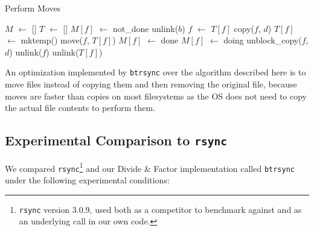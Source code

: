 \documentclass[11pt]{llncs}
\newcommand*\Let[2]{\State #1 $\gets$ #2}
\newcommand{\btrsync}{\texttt{btrsync}\xspace}
\newcommand{\rsync}{\texttt{rsync}\xspace}
\begin{document}
\begin{algorithm}
  \caption{Perform Moves}
  \label{alg:moves}
  \begin{algorithmic}[1]
    \Statex
    \Let{$M$}{[]}
    \Let{$T$}{[]}
      \Let{$M[f]$}{not\_done}
    \EndFor
          \State unlink($b$) 
        \Else
          \State {} 
        \EndIf
      \EndIf
        \Let{$f$}{$T[f]$}
      \EndIf
      \State copy($f$, $d$)
    \EndFunction
        \State \Return {}
      \EndIf
        \Let{$T[f]$}{mktemp()}
        \State move($f$, $T[f]$)
        \Let{$M[f]$}{done}
        \State \Return {}
      \EndIf
      \Let{$M[f]$}{doing}
          \State unblock\_copy($f$, $d$) 
        \EndIf
      \EndFor
        \State unlink($f$)
      \EndIf
        \State unlink($T[f]$)
      \EndIf
    \EndFunction

      \State {}
    \EndFor
  \end{algorithmic}
\end{algorithm}

An optimization implemented by \btrsync over the algorithm described here is to
move files instead of copying them and then removing the original file, because
moves are faster than copies on most filesystems as the OS does not need to copy
the actual file contents to perform them.

\subsection{Experimental Comparison to \rsync}

We compared \rsync\footnote{\rsync version 3.0.9, used both as a competitor to
benchmark against and as an underlying call in our own code.}
and our Divide \& Factor implementation called \btrsync under the following
experimental conditions:
\end{document}
